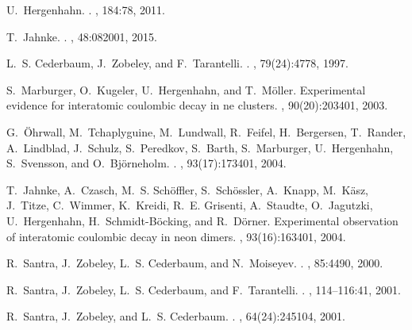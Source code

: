 \documentclass[12pt,twocolumn]{iopart}
\begin{document}
\begin{thebibliography}{10}

U.~Hergenhahn.
.
, 184:78, 2011.

T.~Jahnke.
.
, 48:082001,
  2015.

L.~S. Cederbaum, J.~Zobeley, and F.~Tarantelli.
.
, 79(24):4778, 1997.

S.~Marburger, O.~Kugeler, U.~Hergenhahn, and T.~M{\"o}ller.
\newblock Experimental evidence for interatomic coulombic decay in ne clusters.
, 90(20):203401, 2003.

G.~{\"O}hrwall, M.~Tchaplyguine, M.~Lundwall, R.~Feifel, H.~Bergersen,
  T.~Rander, A.~Lindblad, J.~Schulz, S.~Peredkov, S.~Barth, S.~Marburger,
  U.~Hergenhahn, S.~Svensson, and O.~Bj{\"o}rneholm.
.
, 93(17):173401, 2004.

T.~Jahnke, A.~Czasch, M.~S. Sch{\"o}ffler, S.~Sch{\"o}ssler, A.~Knapp,
  M.~K{\"a}sz, J.~Titze, C.~Wimmer, K.~Kreidi, R.~E. Grisenti, A.~Staudte,
  O.~Jagutzki, U.~Hergenhahn, H.~Schmidt-B{\"o}cking, and R.~D{\"o}rner.
\newblock Experimental observation of interatomic coulombic decay in neon
  dimers.
, 93(16):163401, 2004.

R.~Santra, J.~Zobeley, L.~S. Cederbaum, and N.~Moiseyev.
.
, 85:4490, 2000.

R.~Santra, J.~Zobeley, L.~S. Cederbaum, and F.~Tarantelli.
.
, 114--116:41, 2001.

R.~Santra, J.~Zobeley, and L.~S. Cederbaum.
.
, 64(24):245104, 2001.


\end{thebibliography}
\end{document}

